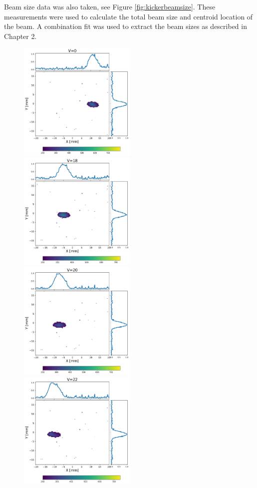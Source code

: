 Beam size data was also taken, see Figure \ref{fig:kickerbeamsize}. 
These measurements were used to calculate the total beam size and 
centroid location of the beam. A combination fit was used to extract 
the beam sizes as described in Chapter 2. 
\begin{figure}
	\includegraphics[width=0.5\textwidth]{./images/yag6_kicker_voltage0}%
	\includegraphics[width=0.5\textwidth]{./images/yag6_kicker_voltage18}\\
	\includegraphics[width=0.5\textwidth]{./images/yag6_kicker_voltage20}%
	\includegraphics[width=0.5\textwidth]{./images/yag6_kicker_voltage22}%

\end{figure}
